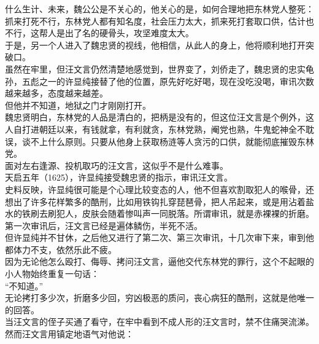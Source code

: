 \begin{multicols}{\theparacolNo}
什么生计、未来，魏公公是不关心的，他关心的是，如何合理地把东林党人整死：抓来打死不行，东林党人都有知名度，社会压力太大，抓来死打套取口供，估计也不行，这帮人是出了名的硬骨头，攻坚难度太大。\\

于是，另一个人进入了魏忠贤的视线，他相信，从此人的身上，他将顺利地打开突破口。\\

虽然在牢里，但汪文言仍然清楚地感觉到，世界变了，刘侨走了，魏忠贤的忠实龟孙，五彪之一的许显纯接替了他的位置，原先好吃好喝，现在没吃没喝，审讯次数越来越多，态度越来越差。\\

但他并不知道，地狱之门才刚刚打开。\\

魏忠贤明白，东林党的人品是清白的，把柄是没有的，但这位汪文言是个例外，这人自打进朝廷以来，有钱就拿，有利就贪，东林党熟，阉党也熟，牛鬼蛇神全不耽误，谈不上什么原则。只要从他身上获取杨涟等人贪污的口供，就能彻底摧毁东林党。\\

面对左右逢源、投机取巧的汪文言，这似乎不是什么难事。\\

天启五年（1625），许显纯接受魏忠贤的指示，审讯汪文言。\\

史料反映，许显纯很可能是个心理比较变态的人，他不但喜欢割取犯人的喉骨，还想出了许多花样繁多的酷刑，比如用铁钩扎穿琵琶骨，把人吊起来，或是用沾着盐水的铁刷去刷犯人，皮肤会随着惨叫声一同脱落。所谓审讯，就是赤裸裸的折磨。\\

第一次审讯后，汪文言已经是遍体鳞伤，半死不活。\\

但许显纯并不甘休，之后他又进行了第二次、第三次审讯，十几次审下来，审到他都体力不支，依然乐此不疲。\\

因为无论他怎么殴打、侮辱、拷问汪文言，逼他交代东林党的罪行，这个不起眼的小人物始终重复一句话：\\

“不知道。”\\

无论拷打多少次，折磨多少回，穷凶极恶的质问，丧心病狂的酷刑，这就是他唯一的回答。\\

当汪文言的侄子买通了看守，在牢中看到不成人形的汪文言时，禁不住痛哭流涕。\\

然而汪文言用镇定地语气对他说：\\


\end{multicols}
